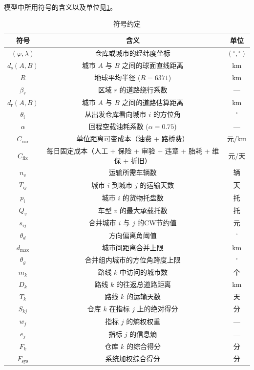 模型中所用符号的含义以及单位见\cref{tab:signal}。
\begin{table}[h]
    \caption{符号约定}\label{tab:signal} \centering
    \begin{tabular}{ccc}
        \toprule[1.5pt]
        符号 & 含义 & 单位 \\
        \midrule[1pt]
        $(\varphi, \lambda)$ & 仓库或城市的经纬度坐标 & $({}^\circ,{}^\circ)$ \\
        $d_{\mathrm{s}}(A,B)$ & 城市 $A$ 与 $B$ 之间的球面直线距离 & km \\
        $R$ & 地球平均半径 ($R = 6371$) & km \\
        $\beta_r$ & 区域 $r$ 的道路绕行系数 & — \\
        $d_{\mathrm{r}}(A,B)$ & 城市 $A$ 与 $B$ 之间的道路估算距离 & km \\
        $\theta_i$ & 从出发仓库看向城市 $i$ 的方位角 & ${}^\circ$ \\
        $\alpha$ & 回程空载油耗系数 ($\alpha = 0.75$) & — \\
        $C_{\mathrm{var}}$ & 单位距离可变成本（油费 + 路桥费）& 元/km \\
        $C_{\mathrm{fix}}$ & 每日固定成本（人工 + 保险 + 审验 + 违章 + 胎耗 + 维保 + 折旧）& 元/天 \\
        $n_v$ & 运输所需车辆数 & 辆 \\
        $T_{ij}$ & 城市 $i$ 到城市 $j$ 的运输天数 & 天 \\
        $p_i$ & 城市 $i$ 的货物托盘数 & 托 \\
        $Q_v$ & 车型 $v$ 的最大承载托数 & 托 \\
        $s_{ij}$ & 合并城市 $i$ 与 $j$ 的CW节约值 & 元 \\
        $\theta_d$ & 方向偏离角阈值 & ${}^\circ$ \\
        $d_{\max}$ & 城市间距离合并上限 & km \\
        $\theta_g$ & 合并组内城市的方位角跨度上限 & ${}^\circ$ \\
        $m_k$ & 路线 $k$ 中访问的城市数 & 个 \\
        $D_k$ & 路线 $k$ 的往返总道路距离 & km \\
        $T_k$ & 路线 $k$ 的运输天数 & 天 \\
        $S_{kj}$ & 仓库 $k$ 在指标 $j$ 上的绝对得分 & 分 \\
        $w_j$ & 指标 $j$ 的熵权权重 & — \\
        $e_j$ & 指标 $j$ 的信息熵 & — \\
        $F_k$ & 仓库 $k$ 的综合得分 & 分 \\
        $F_{\mathrm{sys}}$ & 系统加权综合得分 & 分 \\
        \bottomrule[1.5pt]
    \end{tabular}
\end{table}
